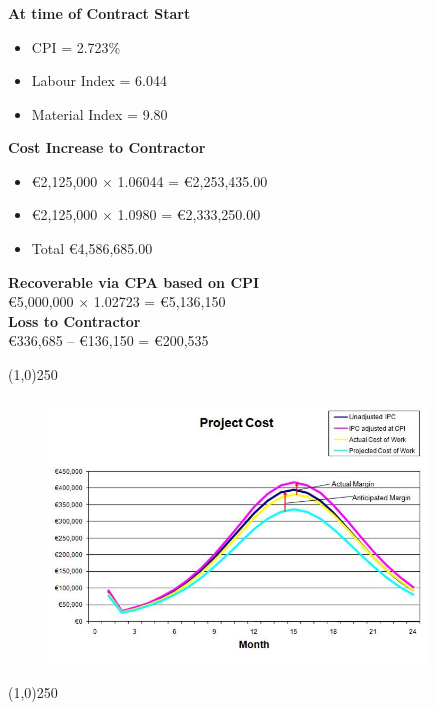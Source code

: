 \begin{frame}
\frametitle{}
\textbf{At time of Contract Start}\\
\begin{itemize}
	\item CPI = 2.723\%
	\item Labour Index = 6.044
	\item Material Index = 9.80
\end{itemize}
%
\textbf{Cost Increase to Contractor}\\
\begin{itemize}
	\item \euro2,125,000 $\times$ 1.06044 = \euro2,253,435.00
	\item \euro2,125,000 $\times$ 1.0980 = 	\euro2,333,250.00
	\item			Total	\euro4,586,685.00
\end{itemize}
\textbf{Recoverable via CPA based on CPI}\\
\euro5,000,000 $\times$ 1.02723 = \euro5,136,150\\
\textbf{Loss to Contractor}\\
\euro336,685 – \euro136,150 = \euro200,535
\end{frame}
\begin{center}\line(1,0){250}\end{center}






\begin{frame}
\frametitle{}
\begin{figure}
	\centering
		\includegraphics[width = 10cm]{images/projmargin.jpg}
	\label{fig:projmargin}
\end{figure}
\end{frame}
\begin{center}\line(1,0){250}\end{center}






